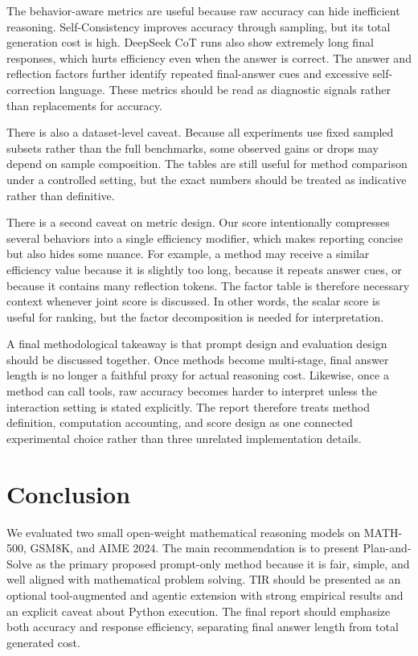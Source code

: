 \documentclass[conference]{IEEEtran}
\newcommand{\mathfive}{MATH-500}
\begin{document}
The behavior-aware metrics are useful because raw accuracy can hide inefficient reasoning. Self-Consistency improves accuracy through sampling, but its total generation cost is high. DeepSeek CoT runs also show extremely long final responses, which hurts efficiency even when the answer is correct. The answer and reflection factors further identify repeated final-answer cues and excessive self-correction language. These metrics should be read as diagnostic signals rather than replacements for accuracy.

There is also a dataset-level caveat. Because all experiments use fixed sampled subsets rather than the full benchmarks, some observed gains or drops may depend on sample composition. The tables are still useful for method comparison under a controlled setting, but the exact numbers should be treated as indicative rather than definitive.

There is a second caveat on metric design. Our score intentionally compresses several behaviors into a single efficiency modifier, which makes reporting concise but also hides some nuance. For example, a method may receive a similar efficiency value because it is slightly too long, because it repeats answer cues, or because it contains many reflection tokens. The factor table is therefore necessary context whenever joint score is discussed. In other words, the scalar score is useful for ranking, but the factor decomposition is needed for interpretation.

A final methodological takeaway is that prompt design and evaluation design should be discussed together. Once methods become multi-stage, final answer length is no longer a faithful proxy for actual reasoning cost. Likewise, once a method can call tools, raw accuracy becomes harder to interpret unless the interaction setting is stated explicitly. The report therefore treats method definition, computation accounting, and score design as one connected experimental choice rather than three unrelated implementation details.

\section{Conclusion}
We evaluated two small open-weight mathematical reasoning models on \mathfive{}, GSM8K, and AIME 2024. The main recommendation is to present Plan-and-Solve as the primary proposed prompt-only method because it is fair, simple, and well aligned with mathematical problem solving. TIR should be presented as an optional tool-augmented and agentic extension with strong empirical results and an explicit caveat about Python execution. The final report should emphasize both accuracy and response efficiency, separating final answer length from total generated cost.

\FloatBarrier


\end{document}
